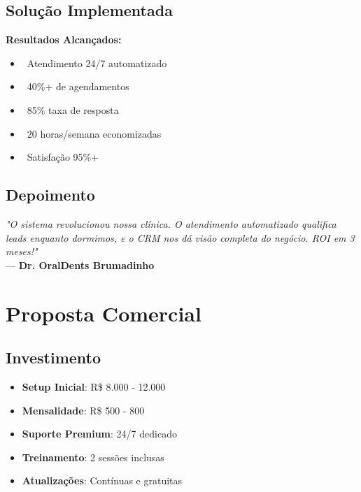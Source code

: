 \documentclass[11pt,a4paper]{article}
\newcommand{\sectiontitle}[1]{\section{\color{oraldentsblue}#1}}
\begin{document}
\subsection{Solução Implementada}
\begin{tcolorbox}[colback=green!5!white,colframe=successgreen]
\textbf{Resultados Alcançados:}
\begin{itemize}
    \item \faRobot\ Atendimento 24/7 automatizado
    \item \faCalendarPlus\ 40\%+ de agendamentos
    \item \faComments\ 85\% taxa de resposta
    \item \faClock\ 20 horas/semana economizadas
    \item \faTrophy\ Satisfação 95\%+
\end{itemize}
\end{tcolorbox}

\subsection{Depoimento}
\begin{tcolorbox}[colback=blue!5!white,colframe=oraldentsblue]
\textit{"O sistema revolucionou nossa clínica. O atendimento automatizado qualifica leads enquanto dormimos, e o CRM nos dá visão completa do negócio. ROI em 3 meses!"}\\
\hfill --- \textbf{Dr. OralDents Brumadinho}
\end{tcolorbox}

\sectiontitle{Proposta Comercial}

\subsection{Investimento}
\begin{tcolorbox}[colback=green!5!white,colframe=successgreen,title={\faDollarSign\ Estrutura de Investimento}]
\begin{itemize}
    \item \textbf{Setup Inicial}: R\$ 8.000 - 12.000
    \item \textbf{Mensalidade}: R\$ 500 - 800
    \item \textbf{Suporte Premium}: 24/7 dedicado
    \item \textbf{Treinamento}: 2 sessões inclusas
    \item \textbf{Atualizações}: Contínuas e gratuitas
\end{itemize}
\end{tcolorbox}
\end{document}
